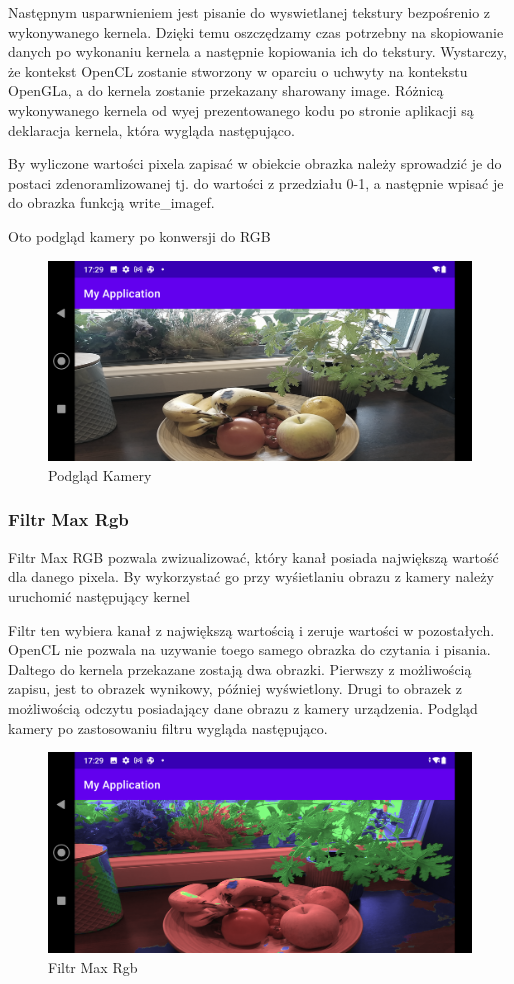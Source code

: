 Następnym usparwnieniem jest pisanie do wyswietlanej tekstury bezpośrenio z wykonywanego kernela. Dzięki temu oszczędzamy czas potrzebny na skopiowanie danych po wykonaniu kernela a następnie kopiowania ich do tekstury. Wystarczy, że kontekst OpenCL zostanie stworzony w oparciu o uchwyty na kontekstu OpenGLa, a do kernela zostanie przekazany sharowany image. Różnicą wykonywanego kernela od wyej prezentowanego kodu po stronie aplikacji są deklaracja kernela, która wygląda następująco.

By wyliczone wartości pixela zapisać w obiekcie obrazka należy sprowadzić je do postaci zdenoramlizowanej tj. do wartości z przedziału 0-1, a następnie wpisać je do obrazka funkcją write\_imagef.

Oto podgląd kamery po konwersji do RGB
\begin{figure}[H]
	\includegraphics[scale=0.16]{imgs/preview.png}
	\caption{Podgląd Kamery}
\end{figure}
\subsubsection[Filtr Max Rgb]{Filtr Max Rgb}
Filtr Max RGB pozwala zwizualizować, który kanał posiada największą wartość dla danego pixela. By wykorzystać go przy wyśietlaniu obrazu z kamery należy uruchomić następujący kernel

Filtr ten wybiera kanał z największą wartością i zeruje wartości w pozostałych. OpenCL nie pozwala na uzywanie toego samego obrazka do czytania i pisania. Daltego do kernela przekazane zostają dwa obrazki. Pierwszy z możliwością zapisu, jest to obrazek wynikowy, później wyświetlony. Drugi to obrazek z możliwością odczytu posiadający dane obrazu z kamery urządzenia. Podgląd kamery po zastosowaniu filtru wygląda następująco.
\begin{figure}[H]
	\includegraphics[scale=0.16]{imgs/maxRgb.png}
	\caption{Filtr Max Rgb}
\end{figure}
